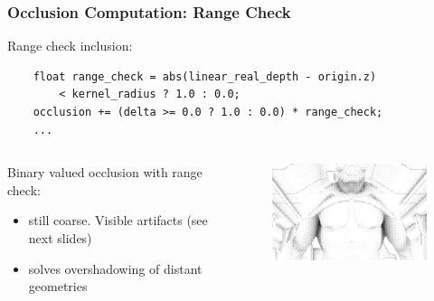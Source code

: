 \documentclass{beamer}
\newcommand{\redtext}[1]{\textcolor{myred}{#1}}
\begin{document}
\begin{frame}[fragile]
\frametitle{Occlusion Computation: Range Check}
Range check inclusion:
\begin{verbatim}
    float range_check = abs(linear_real_depth - origin.z)
        < kernel_radius ? 1.0 : 0.0;
    occlusion += (delta >= 0.0 ? 1.0 : 0.0) * range_check;
    ...
\end{verbatim}

\begin{columns}
    \begin{column}{0.45\linewidth}
        \redtext{Binary} valued occlusion with range check:
        \begin{itemize}
            \item \redtext{still coarse}. Visible artifacts (see next slides)
            \item \redtext{solves} overshadowing of distant geometries 
        \end{itemize}
    \end{column}
    \begin{column}{0.45\linewidth}
        \begin{figure}
            \centering
            \includegraphics[width=0.8\linewidth]{images/occlusion_hard_range_check.png}
        \end{figure}
    \end{column}
\end{columns}

\end{frame}
\end{document}
